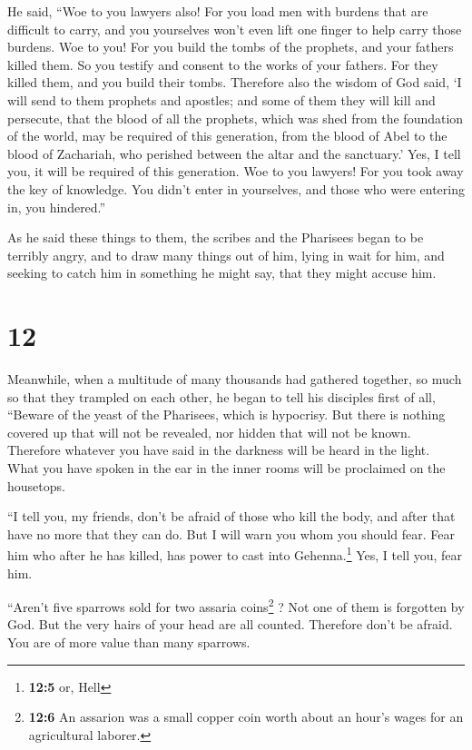  He said, ``Woe to you lawyers also! For you load men
with burdens that are difficult to carry, and you yourselves won't even
lift one finger to help carry those burdens.  Woe to you!
For you build the tombs of the prophets, and your fathers killed them.
 So you testify and consent to the works of your fathers.
For they killed them, and you build their tombs. 
Therefore also the wisdom of God said, `I will send to them prophets and
apostles; and some of them they will kill and persecute, 
that the blood of all the prophets, which was shed from the foundation
of the world, may be required of this generation,  from
the blood of Abel to the blood of Zachariah, who perished between the
altar and the sanctuary.' Yes, I tell you, it will be required of this
generation.  Woe to you lawyers! For you took away the
key of knowledge. You didn't enter in yourselves, and those who were
entering in, you hindered.''

 As he said these things to them, the scribes and the
Pharisees began to be terribly angry, and to draw many things out of
him,  lying in wait for him, and seeking to catch him in
something he might say, that they might accuse him.

\hypertarget{section-11}{%
\section{12}\label{section-11}}

 Meanwhile, when a multitude of many thousands had
gathered together, so much so that they trampled on each other, he began
to tell his disciples first of all, ``Beware of the yeast of the
Pharisees, which is hypocrisy.  But there is nothing
covered up that will not be revealed, nor hidden that will not be known.
 Therefore whatever you have said in the darkness will be
heard in the light. What you have spoken in the ear in the inner rooms
will be proclaimed on the housetops.

 ``I tell you, my friends, don't be afraid of those who
kill the body, and after that have no more that they can do.
 But I will warn you whom you should fear. Fear him who
after he has killed, has power to cast into Gehenna.\footnote{\textbf{12:5}
  or, Hell} Yes, I tell you, fear him.

 ``Aren't five sparrows sold for two assaria
coins\footnote{\textbf{12:6} An assarion was a small copper coin worth
  about an hour's wages for an agricultural laborer.} ? Not one of them
is forgotten by God.  But the very hairs of your head are
all counted. Therefore don't be afraid. You are of more value than many
sparrows.

